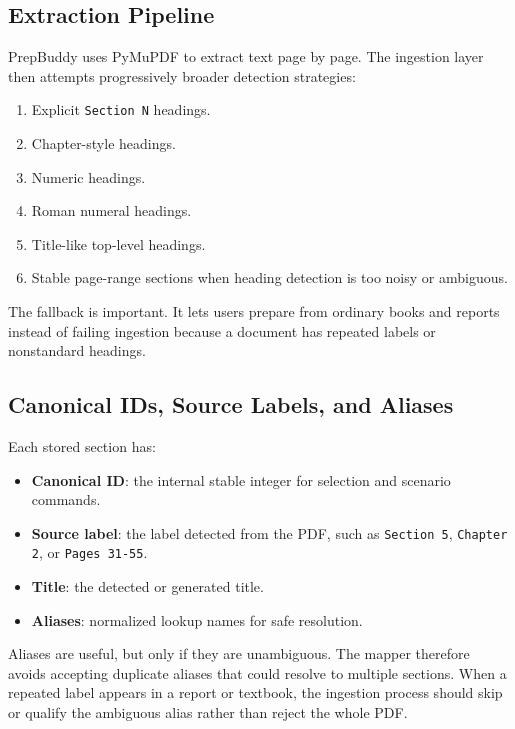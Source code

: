 \documentclass[11pt]{article}
\begin{document}
\subsection{Extraction Pipeline}

PrepBuddy uses PyMuPDF to extract text page by page. The ingestion layer then attempts progressively broader detection strategies:

\begin{enumerate}
  \item Explicit \texttt{Section N} headings.
  \item Chapter-style headings.
  \item Numeric headings.
  \item Roman numeral headings.
  \item Title-like top-level headings.
  \item Stable page-range sections when heading detection is too noisy or ambiguous.
\end{enumerate}

The fallback is important. It lets users prepare from ordinary books and reports instead of failing ingestion because a document has repeated labels or nonstandard headings.

\subsection{Canonical IDs, Source Labels, and Aliases}

Each stored section has:

\begin{itemize}
  \item \textbf{Canonical ID}: the internal stable integer for selection and scenario commands.
  \item \textbf{Source label}: the label detected from the PDF, such as \texttt{Section 5}, \texttt{Chapter 2}, or \texttt{Pages 31-55}.
  \item \textbf{Title}: the detected or generated title.
  \item \textbf{Aliases}: normalized lookup names for safe resolution.
\end{itemize}

Aliases are useful, but only if they are unambiguous. The mapper therefore avoids accepting duplicate aliases that could resolve to multiple sections. When a repeated label appears in a report or textbook, the ingestion process should skip or qualify the ambiguous alias rather than reject the whole PDF.
\end{document}
